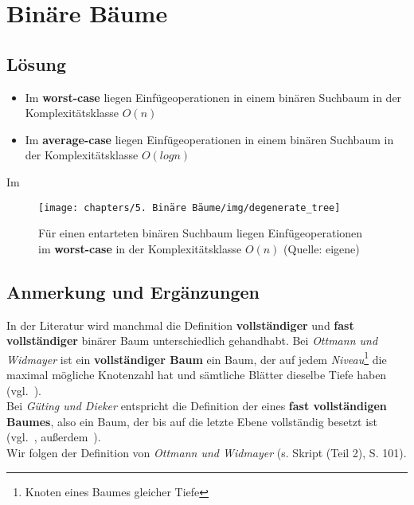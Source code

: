 \chapter{Binäre Bäume}

\section{Lösung}

\begin{itemize}
    \item Im \textbf{worst-case} liegen Einfügeoperationen in einem binären Suchbaum in der Komplexitätsklasse $O(n)$
    \item Im \textbf{average-case} liegen Einfügeoperationen in einem binären Suchbaum in der Komplexitätsklasse $O(log n)$
\end{itemize}

Im \textbf{}


\begin{figure}
    \begin{center}
        \texttt{[image: chapters/5. Binäre Bäume/img/degenerate\_tree]}
        \caption{Für einen entarteten binären Suchbaum liegen Einfügeoperationen im \textbf{worst-case} in der Komplexitätsklasse $O(n)$ (Quelle: eigene)}
        \label{fig:degeneratetree}
    \end{center}
\end{figure}

\section{Anmerkung und Ergänzungen}


\noindent
In der Literatur wird manchmal die Definition \textbf{vollständiger} und \textbf{fast vollständiger} binärer Baum unterschiedlich gehandhabt.
Bei \textit{Ottmann und Widmayer} ist ein \textbf{vollständiger Baum} ein Baum, der auf jedem \textit{Niveau}\footnote{Knoten eines Baumes gleicher Tiefe} die maximal mögliche Knotenzahl hat und sämtliche Blätter dieselbe Tiefe haben (vgl.~\cite[261]{OW17e}).\\
Bei \textit{Güting und Dieker} entspricht die Definition der eines \textbf{fast vollständigen Baumes}, also ein Baum, der bis auf die letzte Ebene vollständig besetzt ist (vgl.~\cite[96]{GD18c}, außerdem~\cite[161]{CL22}).\\
Wir folgen der Definition von \textit{Ottmann und Widmayer} (s. Skript (Teil 2), S.  101).\\

